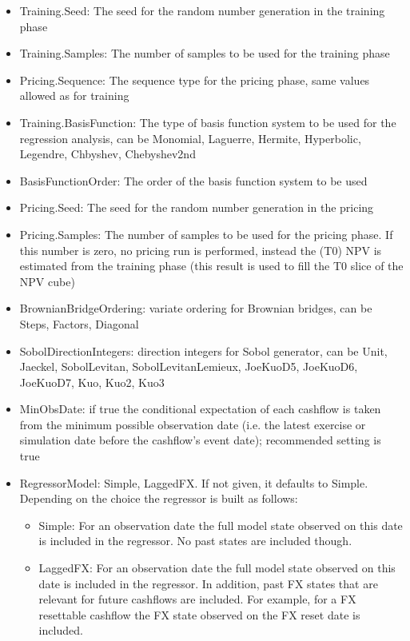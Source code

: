 \begin{itemize}
  Sobol, Burley2020Sobol, SobolBrownianBridge, Burley2020SobolBrownianBridge
\item Training.Seed: The seed for the random number generation in the training phase
\item Training.Samples: The number of samples to be used for the training phase
\item Pricing.Sequence: The sequence type for the pricing phase, same values allowed as for training
\item Training.BasisFunction: The type of basis function system to be used for the regression analysis, can be
  Monomial, Laguerre, Hermite, Hyperbolic, Legendre, Chbyshev, Chebyshev2nd
\item BasisFunctionOrder: The order of the basis function system to be used
\item Pricing.Seed: The seed for the random number generation in the pricing
\item Pricing.Samples: The number of samples to be used for the pricing phase. If this number is zero, no pricing run is
  performed, instead the (T0) NPV is estimated from the training phase (this result is used to fill the T0 slice of the
  NPV cube)
\item BrownianBridgeOrdering: variate ordering for Brownian bridges, can be Steps, Factors, Diagonal
\item SobolDirectionIntegers: direction integers for Sobol generator, can be Unit, Jaeckel, SobolLevitan,
  SobolLevitanLemieux, JoeKuoD5, JoeKuoD6, JoeKuoD7, Kuo, Kuo2, Kuo3
\item MinObsDate: if true the conditional expectation of each cashflow is taken from the minimum possible observation
  date (i.e. the latest exercise or simulation date before the cashflow's event date); recommended setting is true
\item RegressorModel: Simple, LaggedFX. If not given, it defaults to Simple. Depending on the choice the regressor is
  built as follows:
  \begin{itemize}
    \item Simple: For an observation date the full model state observed on this date is included in the regressor. No
      past states are included though.
    \item LaggedFX: For an observation date the full model state observed on this date is included in the regressor. In
      addition, past FX states that are relevant for future cashflows are included. For example, for a FX resettable
      cashflow the FX state observed on the FX reset date is included.

\end{itemize}
\end{itemize}
